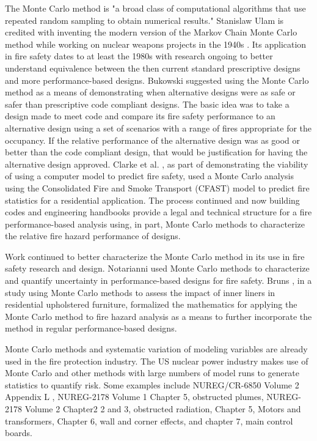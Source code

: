 \documentclass[12pt,twoside]{book}
\begin{document}
The Monte Carlo method is "a broad class of computational algorithms that use repeated random sampling to obtain numerical results." \cite{wikipedia_montecarlo} Stanislaw Ulam is credited with inventing the modern version of the Markov Chain Monte Carlo method while working on nuclear weapons projects in the 1940s \cite{Metropolis:1987}. Its application in fire safety dates to at least the 1980s with research ongoing to better understand equivalence between the then current standard prescriptive designs and more performance-based designs. Bukowski \cite{Bukowski_1985} suggested using the Monte Carlo method as a means of demonstrating when alternative designs were as safe or safer than prescriptive code compliant designs. The basic idea was to take a design made to meet code and compare its fire safety performance to an alternative design using a set of scenarios with a range of fires appropriate for the occupancy. If the relative performance of the alternative design was as good or better than the code compliant design, that would be justification for having the alternative design approved. Clarke et al. \cite{Clarke_1990}, as part of demonstrating the viability of using a computer model to predict fire safety, used a Monte Carlo analysis using the Consolidated Fire and Smoke Transport (CFAST) model to predict fire statistics for a residential application. The process continued and now building codes \cite{NFPA_5000} and engineering handbooks \cite{Hurley_2016} provide a legal and technical structure for a fire performance-based analysis using, in part, Monte Carlo methods to characterize the relative fire hazard performance of designs.

Work continued to better characterize the Monte Carlo method in its use in fire safety research and design. Notarianni \cite{Notarianni:2000} used Monte Carlo methods to characterize and quantify uncertainty in performance-based designs for fire safety. Bruns \cite{bruns_tn_2016}, in a study using Monte Carlo methods to assess the impact of inner liners in residential upholstered furniture, formalized the mathematics for applying the Monte Carlo method to fire hazard analysis as a means to further incorporate the method in regular performance-based designs.

Monte Carlo methods and systematic variation of modeling variables are already used in the fire protection industry. The US nuclear power industry makes use of Monte Carlo and other methods with large numbers of model runs to generate statistics to quantify risk. Some examples include NUREG/CR-6850 Volume 2 Appendix L \cite{NRCNUREGCR6850V2}, NUREG-2178 Volume 1 \cite{NRCNUREG2178V1} Chapter 5, obstructed plumes,  NUREG-2178 Volume 2 \cite{NRCNUREG2178V2} Chapter2 2 and 3, obstructed radiation, Chapter 5, Motors and transformers, Chapter 6, wall and corner effects, and chapter 7, main control boards.
\end{document}
